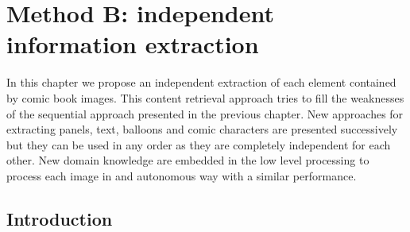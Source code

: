 \chapter{Method B: independent information extraction}
\label{chap:independent}
\graphicspath{{./chapters/4-independent/figs/}}


In this chapter we propose an independent extraction of each element contained by comic book images.
This content retrieval approach tries to fill the weaknesses of the sequential approach presented in the previous chapter.
New approaches for extracting panels, text, balloons and comic characters are presented successively but they can be used in any order as they are completely independent for each other.
New domain knowledge are embedded in the low level processing to process each image in and autonomous way with a similar performance.


\section{Introduction}
\label{sec:in:intro}

